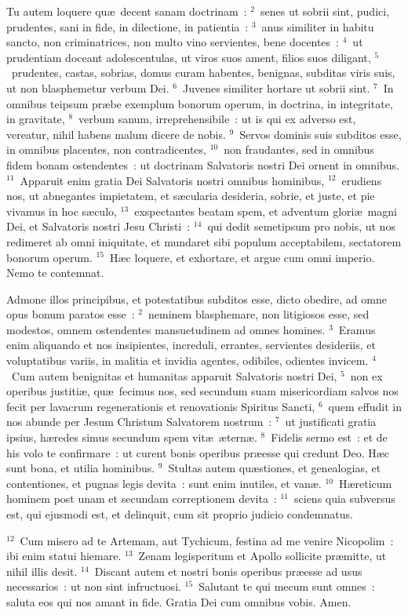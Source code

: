 \lettrine[lines=10,image=true,loversize=0.05,lraise=-0.03]{T}{}u autem loquere qu\ae\ decent sanam doctrinam~:
${}^{2}$~senes ut sobrii sint, pudici, prudentes, sani in fide, in dilectione, in patientia~:
${}^{3}$~anus similiter in habitu sancto, non criminatrices, non multo vino servientes, bene docentes~:
${}^{4}$~ut prudentiam doceant adolescentulas, ut viros suos ament, filios suos diligant,
${}^{5}$~prudentes, castas, sobrias, domus curam habentes, benignas, subditas viris suis, ut non blasphemetur verbum Dei.
${}^{6}$~Juvenes similiter hortare ut sobrii sint.
${}^{7}$~In omnibus teipsum pr\ae be exemplum bonorum operum, in doctrina, in integritate, in gravitate,
${}^{8}$~verbum sanum, irreprehensibile~: ut is qui ex adverso est, vereatur, nihil habens malum dicere de nobis.
${}^{9}$~Servos dominis suis subditos esse, in omnibus placentes, non contradicentes,
${}^{10}$~non fraudantes, sed in omnibus fidem bonam ostendentes~: ut doctrinam Salvatoris nostri Dei ornent in omnibus.
${}^{11}$~Apparuit enim gratia Dei Salvatoris nostri omnibus hominibus,
${}^{12}$~erudiens nos, ut abnegantes impietatem, et s\ae cularia desideria, sobrie, et juste, et pie vivamus in hoc s\ae culo,
${}^{13}$~exspectantes beatam spem, et adventum glori\ae\ magni Dei, et Salvatoris nostri Jesu Christi~:
${}^{14}$~qui dedit semetipsum pro nobis, ut nos redimeret ab omni iniquitate, et mundaret sibi populum acceptabilem, sectatorem bonorum operum.
${}^{15}$~H\ae c loquere, et exhortare, et argue cum omni imperio. Nemo te contemnat.

\lettrine[lines=10,image=true,loversize=0.05,lraise=-0.03]{A}{}dmone illos principibus, et potestatibus subditos esse, dicto obedire, ad omne opus bonum paratos esse~:
${}^{2}$~neminem blasphemare, non litigiosos esse, sed modestos, omnem ostendentes mansuetudinem ad omnes homines.
${}^{3}$~Eramus enim aliquando et nos insipientes, increduli, errantes, servientes desideriis, et voluptatibus variis, in malitia et invidia agentes, odibiles, odientes invicem.
${}^{4}$~Cum autem benignitas et humanitas apparuit Salvatoris nostri Dei,
${}^{5}$~non ex operibus justiti\ae , qu\ae\ fecimus nos, sed secundum suam misericordiam salvos nos fecit per lavacrum regenerationis et renovationis Spiritus Sancti,
${}^{6}$~quem effudit in nos abunde per Jesum Christum Salvatorem nostrum~:
${}^{7}$~ut justificati gratia ipsius, h\ae redes simus secundum spem vit\ae\ \ae tern\ae .
${}^{8}$~Fidelis sermo est~: et de his volo te confirmare~: ut curent bonis operibus pr\ae esse qui credunt Deo. H\ae c sunt bona, et utilia hominibus.
${}^{9}$~Stultas autem qu\ae stiones, et genealogias, et contentiones, et pugnas legis devita~: sunt enim inutiles, et van\ae .
${}^{10}$~H\ae reticum hominem post unam et secundam correptionem devita~:
${}^{11}$~sciens quia subversus est, qui ejusmodi est, et delinquit, cum sit proprio judicio condemnatus.


${}^{12}$~Cum misero ad te Artemam, aut Tychicum, festina ad me venire Nicopolim~: ibi enim statui hiemare.
${}^{13}$~Zenam legisperitum et Apollo sollicite pr\ae mitte, ut nihil illis desit.
${}^{14}$~Discant autem et nostri bonis operibus pr\ae esse ad usus necessarios~: ut non sint infructuosi.
${}^{15}$~Salutant te qui mecum sunt omnes~: saluta eos qui nos amant in fide. Gratia Dei cum omnibus vobis. Amen.
